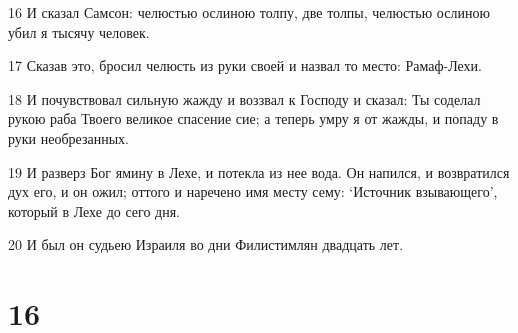 \par 16 И сказал Самсон: челюстью ослиною толпу, две толпы, челюстью ослиною убил я тысячу человек.
\par 17 Сказав это, бросил челюсть из руки своей и назвал то место: Рамаф-Лехи.
\par 18 И почувствовал сильную жажду и воззвал к Господу и сказал: Ты соделал рукою раба Твоего великое спасение сие; а теперь умру я от жажды, и попаду в руки необрезанных.
\par 19 И разверз Бог ямину в Лехе, и потекла из нее вода. Он напился, и возвратился дух его, и он ожил; оттого и наречено имя месту сему: `Источник взывающего', который в Лехе до сего дня.
\par 20 И был он судьею Израиля во дни Филистимлян двадцать лет.

\chapter{16}

